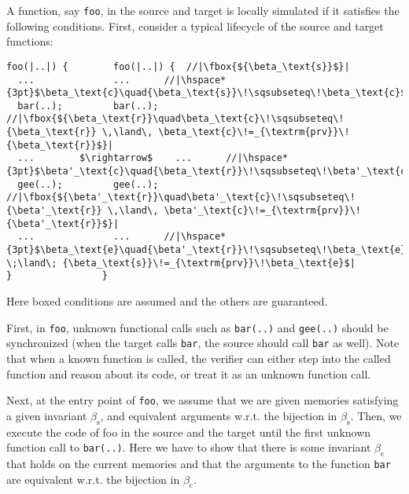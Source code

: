 A function, say \texttt{foo}, in the source and target is locally
simulated if it satisfies the following conditions.  First, consider
a typical lifecycle of the source and target functions:
\begin{center}
\begin{minipage}{0.475\textwidth}
\begin{lstlisting}
foo(|..|) {        foo(|..|) {  //|\fbox{${\beta_\text{s}}$}|
  ...              ...      //|\hspace*{3pt}$\beta_\text{c}\quad{\beta_\text{s}}\!\sqsubseteq\!\beta_\text{c}$|
  bar(..);         bar(..); //|\fbox{${\beta_\text{r}}\quad\beta_\text{c}\!\sqsubseteq\!{\beta_\text{r}} \,\land\, \beta_\text{c}\!=_{\textrm{prv}}\!{\beta_\text{r}}$}|
  ...        $\rightarrow$    ...      //|\hspace*{3pt}$\beta'_\text{c}\quad{\beta_\text{r}}\!\sqsubseteq\!\beta'_\text{c}$|
  gee(..);         gee(..); //|\fbox{${\beta'_\text{r}}\quad\beta'_\text{c}\!\sqsubseteq\!{\beta'_\text{r}} \,\land\, \beta'_\text{c}\!=_{\textrm{prv}}\!{\beta'_\text{r}}$}|
  ...              ...      //|\hspace*{3pt}$\beta_\text{e}\quad{\beta'_\text{r}}\!\sqsubseteq\!\beta_\text{e} \;\land\; {\beta_\text{s}}\!=_{\textrm{prv}}\!\beta_\text{e}$|
}                }
\end{lstlisting}
\end{minipage}
\end{center}
Here boxed conditions are assumed and the others are guaranteed.

First, in \texttt{foo}, unknown functional calls such as
\texttt{bar(..)} and \texttt{gee(..)} should be synchronized (\ie when
the target calls \texttt{bar}, the source should call \texttt{bar} as
well). Note that when a known function is called, the verifier can either step into
the called function and reason about its code, or treat
it as an unknown function call.

Next, at the entry point of \texttt{foo}, we assume that we are given
memories satisfying a given invariant $\beta_\textrm{s}$, and
equivalent arguments w.r.t. the bijection in $\beta_\textrm{s}$.
Then, we execute the code of \textrm{foo} in the source and the target
until the first unknown function call to \texttt{bar(..)}.  Here we have
to show that there is some invariant $\beta_\textrm{c}$ that holds on
the current memories and that the arguments to the function \texttt{bar}
are equivalent w.r.t. the bijection in $\beta_\textrm{c}$.

